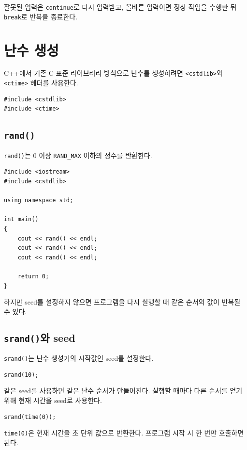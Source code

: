 \documentclass[11pt,a4paper]{article}
\begin{document}
잘못된 입력은 \texttt{continue}로 다시 입력받고,
올바른 입력이면 정상 작업을 수행한 뒤 \texttt{break}로 반복을 종료한다.

\section{난수 생성}

C++에서 기존 C 표준 라이브러리 방식으로 난수를 생성하려면
\texttt{<cstdlib>}와 \texttt{<ctime>} 헤더를 사용한다.

\begin{lstlisting}
#include <cstdlib>
#include <ctime>
\end{lstlisting}

\subsection{\texttt{rand()}}

\texttt{rand()}는 0 이상 \texttt{RAND\_MAX} 이하의 정수를 반환한다.

\begin{lstlisting}
#include <iostream>
#include <cstdlib>

using namespace std;

int main()
{
    cout << rand() << endl;
    cout << rand() << endl;
    cout << rand() << endl;

    return 0;
}
\end{lstlisting}

하지만 seed를 설정하지 않으면 프로그램을 다시 실행할 때
같은 순서의 값이 반복될 수 있다.

\subsection{\texttt{srand()}와 seed}

\texttt{srand()}는 난수 생성기의 시작값인 seed를 설정한다.

\begin{lstlisting}
srand(10);
\end{lstlisting}

같은 seed를 사용하면 같은 난수 순서가 만들어진다.
실행할 때마다 다른 순서를 얻기 위해 현재 시간을 seed로 사용한다.

\begin{lstlisting}
srand(time(0));
\end{lstlisting}

\texttt{time(0)}은 현재 시간을 초 단위 값으로 반환한다.
프로그램 시작 시 한 번만 호출하면 된다.
\end{document}
